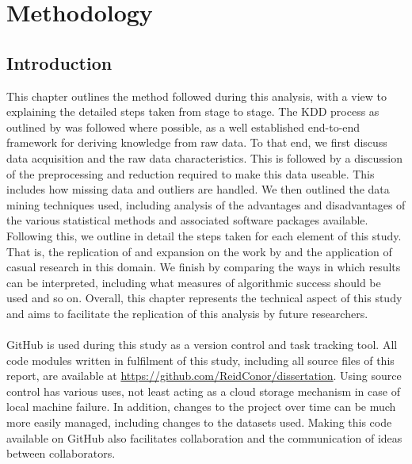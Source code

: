 %
%
%
%

\chapter{Methodology}\label{C.Methodology}
\section{Introduction}
{This chapter outlines the method followed during this analysis, with a view to explaining the detailed steps taken from stage to stage. The KDD process as outlined by \cite{fayyad1996kdd} was followed where possible, as a well established end-to-end framework for deriving knowledge from raw data. To that end, we first discuss data acquisition and the raw data characteristics. This is followed by a discussion of the preprocessing and reduction required to make this data useable. This includes how missing data and outliers are handled. We then outlined the data mining techniques used, including analysis of the advantages and disadvantages of the various statistical methods and associated software packages available. Following this, we outline in detail the steps taken for each element of this study. That is, the replication of and expansion on the work by \cite{moldovan2015learning} and the application of casual research in this domain. We finish by comparing the ways in which results can be interpreted, including what measures of algorithmic success should be used and so on. Overall, this chapter represents the technical aspect of this study and aims to facilitate the replication of this analysis by future researchers. \\\\
GitHub is used during this study as a version control and task tracking tool. All code modules written in fulfilment of this study, including all source files of this report, are available at \url {https://github.com/ReidConor/dissertation}. Using source control has various uses, not least acting as a cloud storage mechanism in case of local machine failure. In addition, changes to the project over time can be much more easily managed, including changes to the datasets used. Making this code available on GitHub also facilitates collaboration and the communication of ideas between collaborators.   }
